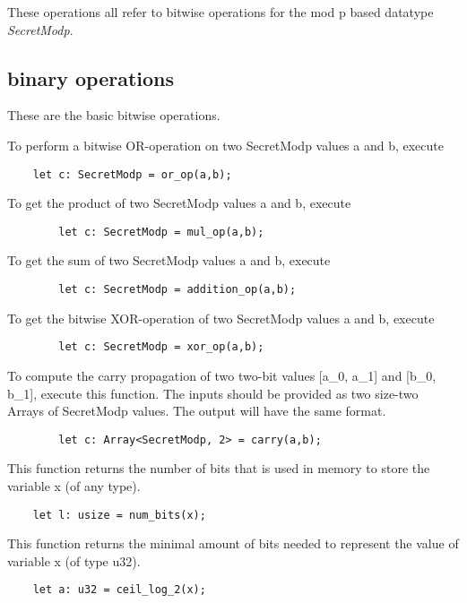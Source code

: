 
These operations all refer to bitwise operations for the mod p based datatype \emph{SecretModp}.

\subsection{binary operations}
These are the basic bitwise operations.

To perform a bitwise OR-operation on two SecretModp values a and b, execute
\begin{lstlisting}
	let c: SecretModp = or_op(a,b);
\end{lstlisting}

To get the product of two SecretModp values a and b, execute
\begin{lstlisting}
        let c: SecretModp = mul_op(a,b);
\end{lstlisting}

To get the sum of two SecretModp values a and b, execute
\begin{lstlisting}
        let c: SecretModp = addition_op(a,b);
\end{lstlisting}

To get the bitwise XOR-operation of two SecretModp values a and b, execute
\begin{lstlisting}
        let c: SecretModp = xor_op(a,b);
\end{lstlisting}

To compute the carry propagation of two two-bit values [a_0, a_1] and [b_0, b_1], execute this function. The inputs should be provided as two size-two Arrays of SecretModp values. The output will have the same format.
\begin{lstlisting}
        let c: Array<SecretModp, 2> = carry(a,b);
\end{lstlisting}

This function returns the number of bits that is used in memory to store the variable x (of any type).
\begin{lstlisting}
	let l: usize = num_bits(x);
\end{lstlisting}

This function returns the minimal amount of bits needed to represent the value of variable x (of type u32).
\begin{lstlisting}
	let a: u32 = ceil_log_2(x);
\end{lstlisting}

